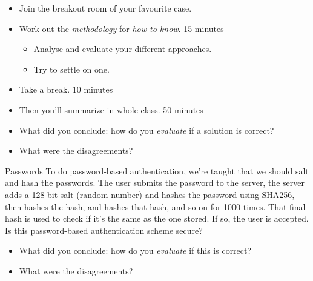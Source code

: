 \begin{frame}[fragile]
  \begin{exercise}
    \begin{itemize}
      \item Join the breakout room of your favourite case.
      \item Work out the \emph{methodology} for \emph{how to know}.
        \hfill 15 minutes%
        \begin{itemize}
          \item Analyse and evaluate your different approaches.
          \item Try to settle on one.
        \end{itemize}
      \item Take a break.
        \hfill 10 minutes%
      \item Then you'll summarize in whole class.
        \hfill 50 minutes%
    \end{itemize}
  \end{exercise}

  \begin{question}
    \begin{itemize}
      \item What did you conclude: how do you \emph{evaluate} if a solution 
        is correct?
      \item What were the disagreements?
    \end{itemize}
  \end{question}
\end{frame}

\begin{frame}
  \begin{block}{Passwords}
    To do password-based authentication, we're taught that we should salt
    and hash the passwords. The user submits the password to the server,
    the server adds a 128-bit salt (random number) and hashes the password
    using SHA256, then hashes the hash, and hashes that hash, and so on for 1000 
    times. That final hash is used to check if it's the same as the one stored. If 
    so, the user is accepted. Is this password-based authentication scheme secure?
  \end{block}

  \begin{question}
    \begin{itemize}
      \item What did you conclude: how do you \emph{evaluate} if this is 
        correct?
      \item What were the disagreements?
    \end{itemize}
  \end{question}
\end{frame}

